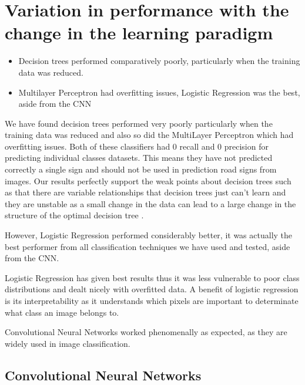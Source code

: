 \documentclass[11pt]{article}
\begin{document}
\newpage
\section{Variation in performance with the change in the learning paradigm}
\begin{itemize}
  \item Decision trees performed comparatively poorly, particularly when the training data was reduced.
  \item Multilayer Perceptron had overfitting issues, Logistic Regression was the best, aside from the CNN
\end{itemize}
We have found decision trees performed very poorly particularly when the training data was reduced and also so did the MultiLayer Perceptron which had overfitting issues. Both of these classifiers had 0 recall and 0 precision for predicting individual classes datasets. This means they have not predicted correctly a single sign and should not be used in prediction road signs from images. Our results perfectly support the weak points about decision trees such as that there are variable relationships that decision trees just can’t learn and they are unstable as a small change in the data can lead to a large change in the structure of the optimal decision tree \cite{zhaoComparisonDecisionTree2008}.
\par
However, Logistic Regression performed considerably better, it was actually the best performer from all classification techniques we have used and tested, aside from the CNN. 
\par
Logistic Regression has given best results thus it was less vulnerable to poor class distributions and dealt nicely with overfitted data. A benefit of logistic regression is its interpretability as it understands which pixels are important to determinate what class an image belongs to.
\par
Convolutional Neural Networks worked phenomenally as expected, as they are widely used in image classification.

\newpage
\subsection{Convolutional Neural Networks}
\end{document}
